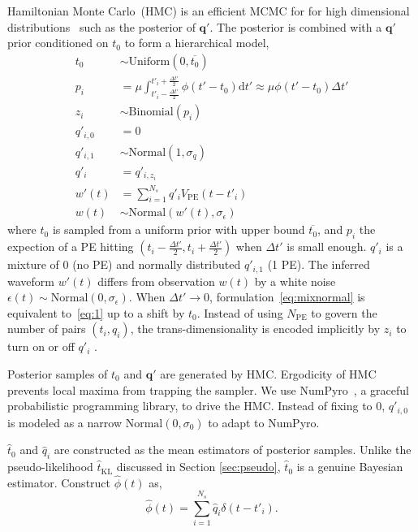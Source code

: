 Hamiltonian Monte Carlo~(HMC) is an efficient MCMC for for high dimensional distributions~\cite{neal_mcmc_2012} such as the posterior of $\bm{q'}$.  The posterior is combined with a $\bm{q'}$ prior conditioned on $t_0$ to form a hierarchical model,
\begin{equation}
  \begin{aligned}
    t_{0} &\sim \mathrm{Uniform}(0, \overline{t_0}) \\
    p_i &= \mu \int_{t'_i-\frac{\Delta t'}{2}}^{t'_i+\frac{\Delta t'}{2}} \phi(t' - t_0)\mathrm{d}t' \approx \mu\phi(t' - t_0)\Delta{t'}  \\
    z_i &\sim \mathrm{Binomial}(p_i) \\
    q'_{i,0}&=0\\
    q'_{i,1}& \sim \mathrm{Normal}(1, \sigma_q)\\
    q'_i &= q'_{i,z_i}\\
    w'(t) & = \sum_{i=1}^{N_s}q'_iV_\mathrm{PE}(t-t'_i)\\
    w(t) &\sim \mathrm{Normal}(w'(t), \sigma_\epsilon)
  \end{aligned}
  \label{eq:mixnormal}
\end{equation}
where $t_{0}$ is sampled from a uniform prior with upper bound $\overline{t_{0}}$, and $p_i$ the expection of a PE hitting $(t_{i} - \frac{\Delta t'}{2}, t_{i} + \frac{\Delta t'}{2})$ when $\Delta t'$ is small enough. $q'_i$ is a mixture of 0 (no PE) and normally distributed $q'_{i,1}$ (1 PE).  The inferred waveform $w'(t)$ differs from observation $w(t)$ by a white noise $\epsilon(t) \sim \mathrm{Normal}(0, \sigma_\epsilon)$.  When $\Delta{t'} \to 0$, formulation~\eqref{eq:mixnormal} is equivalent to~\eqref{eq:1} up to a shift by $t_0$.  Instead of using $N_\mathrm{PE}$ to govern the number of pairs $(t_i, q_i)$, the trans-dimensionality is encoded implicitly by $z_i$ to turn on or off $q'_i$ .

Posterior samples of $t_0$ and $\bm{q'}$ are generated by HMC.   Ergodicity of HMC prevents local maxima from trapping the sampler.  We use NumPyro~\cite{phan2019composable}, a graceful probabilistic programming library, to drive the HMC.  Instead of fixing to 0, $q'_{i,0}$ is modeled as a narrow $\mathrm{Normal}(0, \sigma_0)$ to adapt to NumPyro.

$\hat{t}_0$ and $\hat{q}_i$ are constructed as the mean estimators of posterior samples.  Unlike the pseudo-likelihood $\hat{t}_\mathrm{KL}$ discussed in Section \ref{sec:pseudo}, $\hat{t}_0$ is a genuine Bayesian estimator.  Construct $\hat{\phi}(t)$ as,
\begin{equation}
  \label{eq:mcmc-phi}
  \hat{\phi}(t) = \sum_{i=1}^{N_s}\hat{q}_i\delta(t-t'_i).
\end{equation}

